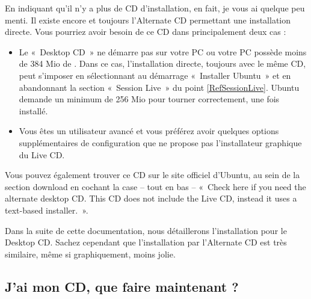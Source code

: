 \begin{nota}
En indiquant qu'il n'y a plus de CD d'installation, en fait, je vous ai quelque peu menti. Il existe encore et toujours l'Alternate CD permettant une installation directe. Vous pourriez avoir besoin de ce CD dans principalement deux cas :\par
\begin{itemize}
\item Le «~Desktop CD~» ne démarre pas sur votre PC ou votre PC possède moins de 384 Mio de . Dans ce cas, l'installation directe, toujours avec le même CD, peut s'imposer en sélectionnant au démarrage «~Installer Ubuntu~» et en abandonnant la section «~Session Live~» du point \ref{RefSessionLive}. Ubuntu demande un minimum de 256 Mio pour tourner correctement, une fois installé.
\item Vous êtes un utilisateur avancé et vous préférez avoir quelques options supplémentaires de configuration que ne propose pas l'installateur graphique du Live CD.
\end{itemize}
\end{nota}
Vous pouvez également trouver ce CD sur le site officiel d'Ubuntu, au sein de la section download en cochant la case -- tout en bas -- «~Check here if you need the alternate desktop CD. This CD does not include the Live CD, instead it uses a text-based installer.~».\par
Dans la suite de cette documentation, nous détaillerons l'installation pour le Desktop CD. Sachez cependant que l'installation par l'Alternate CD est très similaire, même si graphiquement, moins jolie.
\subsection{J'ai mon CD, que faire maintenant ?}
